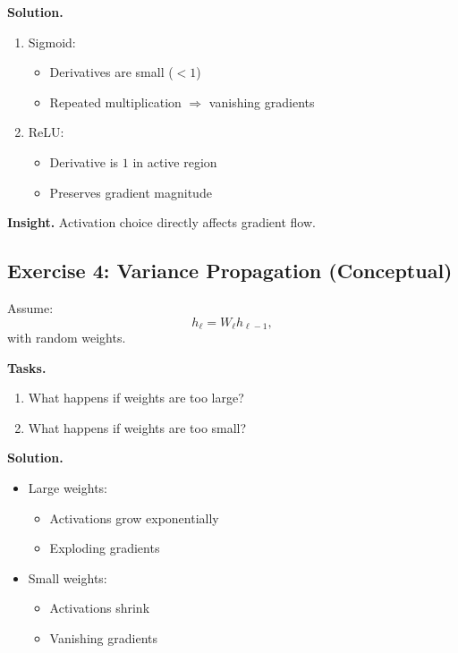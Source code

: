 \medskip

\noindent
\textbf{Solution.}

\begin{enumerate}
\item Sigmoid:
\begin{itemize}
    \item Derivatives are small ($<1$)
    \item Repeated multiplication $\Rightarrow$ vanishing gradients
\end{itemize}

\item ReLU:
\begin{itemize}
    \item Derivative is $1$ in active region
    \item Preserves gradient magnitude
\end{itemize}
\end{enumerate}

\medskip

\noindent
\textbf{Insight.}  
Activation choice directly affects gradient flow.

\subsection{Exercise 4: Variance Propagation (Conceptual)}

Assume:
\[
h_\ell = W_\ell h_{\ell-1},
\]
with random weights.

\medskip

\noindent
\textbf{Tasks.}
\begin{enumerate}
    \item What happens if weights are too large?
    \item What happens if weights are too small?
\end{enumerate}

\medskip

\noindent
\textbf{Solution.}

\begin{itemize}
    \item Large weights:
    \begin{itemize}
        \item Activations grow exponentially
        \item Exploding gradients
    \end{itemize}

    \item Small weights:
    \begin{itemize}
        \item Activations shrink
        \item Vanishing gradients
    \end{itemize}
\end{itemize}

